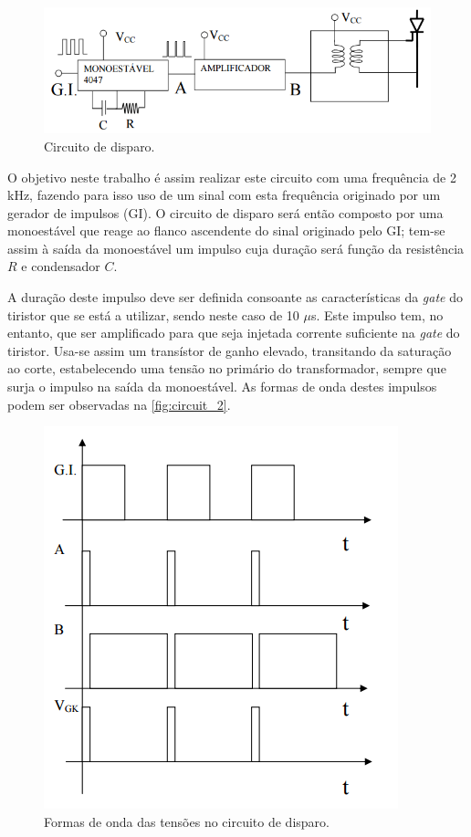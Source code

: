 \documentclass[a4paper,11pt]{article}
\numberwithin{equation}{section}
\begin{document}
\begin{figure}[h]
	\centering
	\includegraphics[keepaspectratio=true, scale=0.37]{teoricas/trigger_circuit}
	\caption{Circuito de disparo.}
	\label{fig:circuit_1}
	\vspace{-0.8em}
\end{figure}

O objetivo neste trabalho é assim realizar este circuito com uma frequência de 2 kHz, fazendo para isso uso de um sinal com esta frequência originado por um gerador de impulsos (GI). O circuito de disparo será então composto por uma monoestável que reage ao flanco ascendente do sinal originado pelo GI; tem-se assim à saída da monoestável um impulso cuja duração será função da resistência $R$ e condensador $C$. 

A duração deste impulso deve ser definida consoante as características da \textit{gate} do tiristor que se está a utilizar, sendo neste caso de 10 $\mu$s. Este impulso tem, no entanto, que ser amplificado para que seja injetada corrente suficiente na \textit{gate} do tiristor. Usa-se assim um transístor de ganho elevado, transitando da saturação ao corte, estabelecendo uma tensão no primário do transformador, sempre que surja o impulso na saída da monoestável. As formas de onda destes impulsos podem ser observadas na \autoref{fig:circuit_2}.

\begin{figure}[h]
	\centering
	\includegraphics[keepaspectratio=true, scale=0.45]{teoricas/trigger_waveform}
	\caption{Formas de onda das tensões no circuito de disparo.}
	\label{fig:circuit_2}
	\vspace{-0.8em}
\end{figure}
\end{document}
